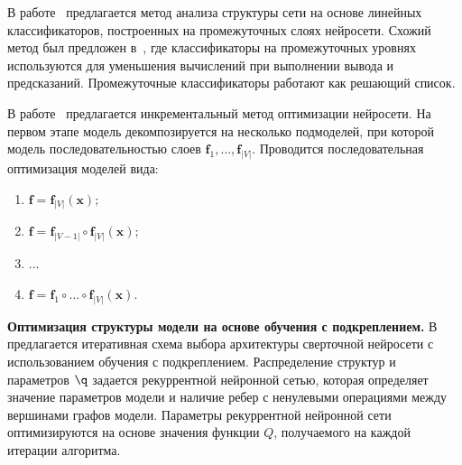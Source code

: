  
 
В работе~\cite{layer_probe} предлагается метод анализа структуры сети на основе линейных классификаторов, построенных на промежуточных слоях нейросети.
Схожий метод был предложен в~\cite{branches}, где классификаторы на промежуточных уровнях используются для уменьшения вычислений при выполнении вывода и предсказаний.
Промежуточные классификаторы работают как решающий список.

В работе~\cite{nn_inc} предлагается инкрементальный метод оптимизации нейросети. На первом этапе модель декомпозируется на несколько подмоделей, при которой модель последовательностью слоев $\mathbf{f}_1,\dots,\mathbf{f}_{|V|}$. Проводится последовательная оптимизация моделей вида:
\begin{enumerate}[1)]
\item $\mathbf{f} = \mathbf{f}_{|V|} (\mathbf{x});$
\item $\mathbf{f} = \mathbf{f}_{|V-1|} \circ \mathbf{f}_{|V|} (\mathbf{x});$
\item ...
\item $\mathbf{f} = \mathbf{f}_{1} \circ \dots \circ \mathbf{f}_{|V|} (\mathbf{x}).$
\end{enumerate}




\par{\textbf{Оптимизация структуры модели на основе обучения с подкреплением. }}
В~\cite{reinf} предлагается итеративная схема выбора архитектуры сверточной нейросети с использованием обучения с подкреплением. Распределение структур и параметров $\q$ задается рекуррентной нейронной сетью, которая определяет значение параметров модели и наличие ребер с ненулевыми операциями между вершинами графов модели. Параметры рекуррентной нейронной сети оптимизируются на основе значения функции $Q$, получаемого на каждой итерации алгоритма.



